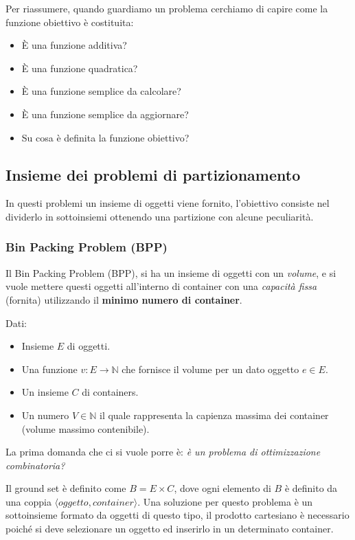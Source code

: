\documentclass{article}
\begin{document}
Per riassumere, quando guardiamo un problema cerchiamo di capire come la funzione obiettivo è costituita:
\begin{itemize}
    \item È una funzione additiva?
    \item È una funzione quadratica?
    \item È una funzione semplice da calcolare?
    \item È una funzione semplice da aggiornare?
    \item Su cosa è definita la funzione obiettivo?
\end{itemize}

\subsection{Insieme dei problemi di partizionamento}
In questi problemi un insieme di oggetti viene fornito, l'obiettivo consiste nel dividerlo in sottoinsiemi ottenendo una partizione con alcune peculiarità.
\subsubsection{Bin Packing Problem (BPP)}
Il Bin Packing Problem (BPP), si ha un insieme di oggetti con un \textit{volume}, e si vuole mettere questi oggetti all'interno di
container con una \textit{capacità fissa} (fornita) utilizzando il \textbf{minimo numero di container}.

Dati:
\begin{itemize}
    \item Insieme $E$ di oggetti.
    \item Una funzione $v:E \rightarrow \mathbb{N}$ che fornisce il volume per un dato oggetto $e\in E$.
    \item Un insieme $C$ di containers.
    \item Un numero $V\in \mathbb{N}$ il quale rappresenta la capienza massima dei container (volume massimo contenibile).
\end{itemize}

La prima domanda che ci si vuole porre è: \textit{è un problema di ottimizzazione combinatoria?}

Il ground set è definito come $B=E\times C$, dove ogni elemento di $B$ è definito da una coppia $\langle oggetto, container\rangle$. Una soluzione
per questo problema è un sottoinsieme formato da oggetti di questo tipo, il prodotto cartesiano è necessario poiché si deve selezionare un oggetto ed inserirlo in un determinato container.
\end{document}
